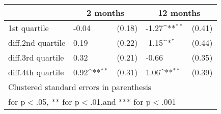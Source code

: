{
\def\sym#1{\ifmmode^{#1}\else\(^{#1}\)\fi}
\begin{tabular*}{.65\hsize}{@{\hskip\tabcolsep\extracolsep\fill}l*{2}{lc}}
\toprule
                &\multicolumn{2}{c}{2 months}&\multicolumn{2}{c}{12 months}\\
\midrule
1st quartile    &    -0.04         &   (0.18)&    -1.27\sym{**} &   (0.41)\\
diff.2nd quartile&     0.19         &   (0.22)&    -1.15\sym{*}  &   (0.44)\\
diff.3rd quartile&     0.32         &   (0.21)&    -0.66         &   (0.35)\\
diff.4th quartile&     0.92\sym{**} &   (0.31)&     1.06\sym{**} &   (0.39)\\
\bottomrule
\multicolumn{5}{l}{\footnotesize Clustered standard errors in parenthesis}\\
\multicolumn{5}{l}{\footnotesize * for p$<$.05, ** for p$<$.01,and *** for p$<$.001}\\
\end{tabular*}
}
